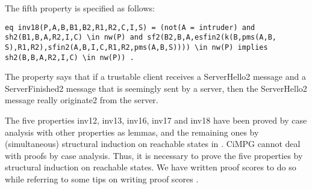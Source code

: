\documentclass[a4paper,fleqn]{cas-dc}
\begin{document}
The fifth property is specified as follows:
\begin{small}
\begin{verbatim}
eq inv18(P,A,B,B1,B2,R1,R2,C,I,S) = (not(A = intruder) and 
sh2(B1,B,A,R2,I,C) \in nw(P) and sf2(B2,B,A,esfin2(k(B,pms(A,B,
S),R1,R2),sfin2(A,B,I,C,R1,R2,pms(A,B,S)))) \in nw(P) implies 
sh2(B,B,A,R2,I,C) \in nw(P)) .
\end{verbatim}
\end{small}
The property says that if a trustable client receives a ServerHello2 message and
a ServerFinished2 message that is seemingly sent by a server, then the ServerHello2
message really originate2 from the server.


The five properties inv12, inv13, inv16, inv17 and inv18 have been proved by case analysis with other properties as lemmas, and the remaining ones by (simultaneous) structural induction on reachable states in \cite{1437139}. CiMPG cannot deal with proofs by case analysis. Thus, it is necessary to prove the five properties by structural induction on reachable states. We have written proof scores to do so while referring to some tips on writing proof scores \cite{Ogata2006}.

\end{document}
